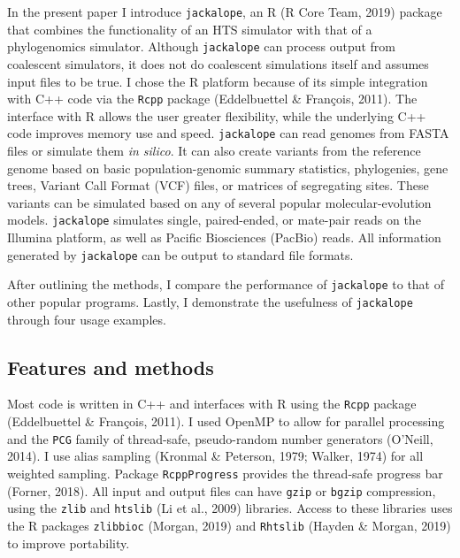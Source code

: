 \documentclass[12pt,]{article}
\begin{document}
In the present paper I introduce \texttt{jackalope}, an R (R Core Team, 2019) package
that combines the functionality of an HTS simulator with that of a
phylogenomics simulator.
Although \texttt{jackalope} can process output from coalescent simulators,
it does not do coalescent simulations itself and assumes input files to be true.
I chose the R platform because of its simple integration with C++ code via
the \texttt{Rcpp} package (Eddelbuettel \& François, 2011).
The interface with R allows the user greater flexibility, while the underlying
C++ code improves memory use and speed.
\texttt{jackalope} can read genomes from FASTA files or simulate them \emph{in silico}.
It can also create variants from the reference genome based on basic
population-genomic summary statistics, phylogenies, gene trees,
Variant Call Format (VCF) files, or matrices of segregating sites.
These variants can be simulated based on any of several popular
molecular-evolution models.
\texttt{jackalope} simulates single, paired-ended, or mate-pair reads on the Illumina platform,
as well as Pacific Biosciences (PacBio) reads.
All information generated by \texttt{jackalope} can be output to standard file formats.

After outlining the methods, I compare the performance of \texttt{jackalope} to that of
other popular programs.
Lastly, I demonstrate the usefulness of \texttt{jackalope} through four usage examples.

\hypertarget{features-and-methods}{%
\subsection{Features and methods}\label{features-and-methods}}

Most code is written in C++ and interfaces with R using the \texttt{Rcpp} package
(Eddelbuettel \& François, 2011).
I used OpenMP to allow for parallel processing and
the \texttt{PCG} family of thread-safe, pseudo-random number generators
(O'Neill, 2014).
I use alias sampling (Kronmal \& Peterson, 1979; Walker, 1974) for all weighted sampling.
Package \texttt{RcppProgress} provides the thread-safe progress bar
(Forner, 2018).
All input and output files can have \texttt{gzip} or \texttt{bgzip} compression, using the
\texttt{zlib} and \texttt{htslib} (Li et al., 2009) libraries.
Access to these libraries uses the R packages
\texttt{zlibbioc} (Morgan, 2019) and \texttt{Rhtslib} (Hayden \& Morgan, 2019) to improve portability.
\end{document}
